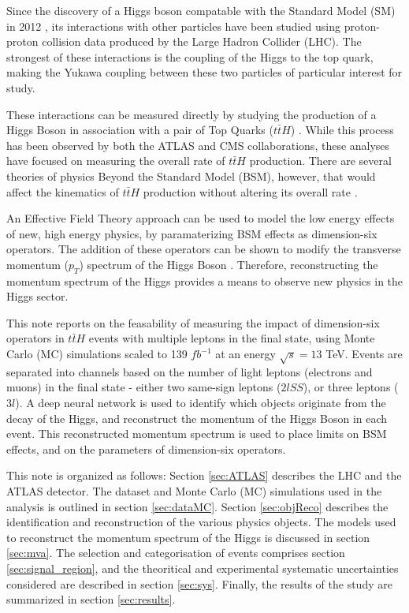 Since the discovery of a Higgs boson compatable with the Standard Model (SM) in 2012 \cite{}, its interactions with other particles have been studied using proton-proton collision data produced by the Large Hadron Collider (LHC). The strongest of these interactions is the coupling of the Higgs to the top quark, making the Yukawa coupling between these two particles of particular interest for study.

These interactions can be measured directly by studying the production of a Higgs Boson in association with a pair of Top Quarks ($t\bar{t}H$) \cite{}. While this process has been observed by both the ATLAS \cite{} and CMS \cite{} collaborations, these analyses have focused on measuring the overall rate of $t\bar{t}H$ production. There are several theories of physics Beyond the Standard Model (BSM), however, that would affect the kinematics of $t\bar{t}H$ production without altering its overall rate \cite{}.  

An Effective Field Theory approach can be used to model the low energy effects of new, high energy physics, by paramaterizing BSM effects as dimension-six operators. The addition of these operators can be shown to modify the transverse momentum ($p_T$) spectrum of the Higgs Boson \cite{}. Therefore, reconstructing the momentum spectrum of the Higgs provides a means to observe new physics in the Higgs sector.  

This note reports on the feasability of measuring the impact of dimension-six operators in $t\bar{t}H$ events with multiple leptons in the final state, using Monte Carlo (MC) simulations scaled to 139 $fb^{-1}$ at an energy $\sqrt{s} = 13$ TeV. Events are separated into channels based on the number of light leptons (electrons and muons) in the final state - either two same-sign leptons ($2lSS$), or three leptons ($3l$). A deep neural network is used to identify which objects originate from the decay of the Higgs, and reconstruct the momentum of the Higgs Boson in each event. This reconstructed momentum spectrum is used to place limits on BSM effects, and on the parameters of dimension-six operators.

This note is organized as follows: Section \ref{sec:ATLAS} describes the LHC and the ATLAS detector. The dataset and Monte Carlo (MC) simulations used in the analysis is outlined in section \ref{sec:dataMC}. Section \ref{sec:objReco} describes the identification and reconstruction of the various physics objects. The models used to reconstruct the momentum spectrum of the Higgs is discussed in section \ref{sec:mva}. The selection and categorisation of events comprises section \ref{sec:signal_region}, and the theoritical and experimental systematic uncertainties considered are described in section \ref{sec:sys}. Finally, the results of the study are summarized in section \ref{sec:results}.
